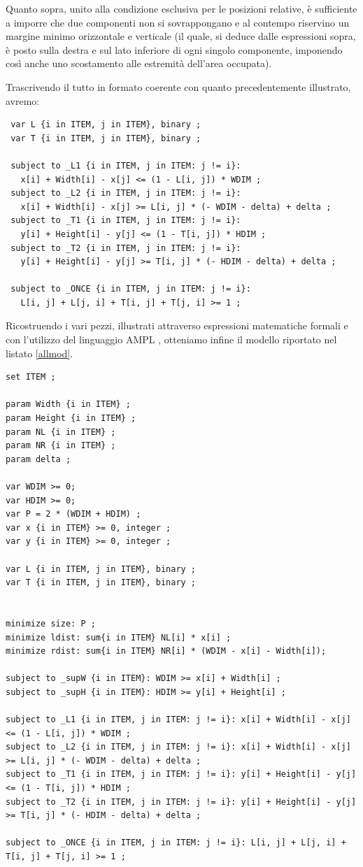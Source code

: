 Quanto sopra, unito alla condizione esclusiva per le posizioni relative, è sufficiente a imporre che due componenti non si sovrappongano e al contempo riservino un margine minimo orizzontale e verticale (il quale, si deduce dalle espressioni sopra, è posto sulla destra e sul lato inferiore di ogni singolo componente, imponendo così anche uno scostamento alle estremità dell'area occupata).

Trascrivendo il tutto in formato coerente con quanto precedentemente illustrato, avremo:
\small
\begin{verbatim}
 var L {i in ITEM, j in ITEM}, binary ;
 var T {i in ITEM, j in ITEM}, binary ;

 subject to _L1 {i in ITEM, j in ITEM: j != i}:
   x[i] + Width[i] - x[j] <= (1 - L[i, j]) * WDIM ;
 subject to _L2 {i in ITEM, j in ITEM: j != i}:
   x[i] + Width[i] - x[j] >= L[i, j] * (- WDIM - delta) + delta ;
 subject to _T1 {i in ITEM, j in ITEM: j != i}:
   y[i] + Height[i] - y[j] <= (1 - T[i, j]) * HDIM ;
 subject to _T2 {i in ITEM, j in ITEM: j != i}:
   y[i] + Height[i] - y[j] >= T[i, j] * (- HDIM - delta) + delta ;

 subject to _ONCE {i in ITEM, j in ITEM: j != i}:
   L[i, j] + L[j, i] + T[i, j] + T[j, i] >= 1 ;
\end{verbatim}
\normalsize

Ricostruendo i vari pezzi, illustrati attraverso espressioni matematiche formali e con l'utilizzo del linguaggio AMPL \cite{ampl}, otteniamo infine il modello riportato nel listato \ref{allmod}.

\lstset{basicstyle=\small, language=, breaklines, breakatwhitespace}
\begin{lstlisting}[caption={Modello per floor-planning in sistemi CAD},float,captionpos=b,label=allmod,frame=lines]
set ITEM ;

param Width {i in ITEM} ;
param Height {i in ITEM} ;
param NL {i in ITEM} ;
param NR {i in ITEM} ;
param delta ;

var WDIM >= 0;
var HDIM >= 0;
var P = 2 * (WDIM + HDIM) ;
var x {i in ITEM} >= 0, integer ;
var y {i in ITEM} >= 0, integer ;

var L {i in ITEM, j in ITEM}, binary ;
var T {i in ITEM, j in ITEM}, binary ;


minimize size: P ;
minimize ldist: sum{i in ITEM} NL[i] * x[i] ;
minimize rdist: sum{i in ITEM} NR[i] * (WDIM - x[i] - Width[i]);

subject to _supW {i in ITEM}: WDIM >= x[i] + Width[i] ;
subject to _supH {i in ITEM}: HDIM >= y[i] + Height[i] ;

subject to _L1 {i in ITEM, j in ITEM: j != i}: x[i] + Width[i] - x[j] <= (1 - L[i, j]) * WDIM ;
subject to _L2 {i in ITEM, j in ITEM: j != i}: x[i] + Width[i] - x[j] >= L[i, j] * (- WDIM - delta) + delta ;
subject to _T1 {i in ITEM, j in ITEM: j != i}: y[i] + Height[i] - y[j] <= (1 - T[i, j]) * HDIM ;
subject to _T2 {i in ITEM, j in ITEM: j != i}: y[i] + Height[i] - y[j] >= T[i, j] * (- HDIM - delta) + delta ;

subject to _ONCE {i in ITEM, j in ITEM: j != i}: L[i, j] + L[j, i] + T[i, j] + T[j, i] >= 1 ;
\end{lstlisting}

